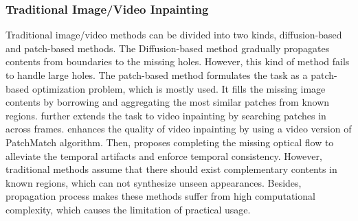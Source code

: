 \subsubsection{Traditional Image/Video Inpainting }
Traditional image/video methods can be divided into two kinds, diffusion-based and patch-based methods. The Diffusion-based method \cite{bertalmio2000image,ballester2001filling} gradually propagates contents from boundaries to the missing holes. However, this kind of method fails to handle large holes. 
The patch-based method \cite{bertalmio2003simultaneous,efros2001image} formulates the task as a patch-based optimization problem, which is mostly used. It fills the missing image contents by borrowing and aggregating the most similar patches from known regions. \cite{patwardhan2007video} further extends the task to video inpainting by searching patches in across frames. \cite{newson2014video} enhances the quality of video inpainting by using a video version of PatchMatch algorithm. Then, \cite{huang2016temporally} proposes completing the missing optical flow to alleviate the temporal artifacts and enforce temporal consistency. 
However, traditional methods assume that there should exist complementary contents in known regions, which can not synthesize unseen appearances. Besides, propagation process makes these methods suffer from high computational complexity, which causes the limitation of practical usage. 

